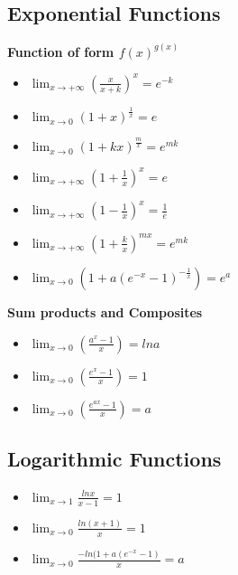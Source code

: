 \documentclass[twocolumn, 10pt]{article}
\begin{document}
\subsection{Exponential Functions}
\textbf{Function of form $f(x)^{g(x)}$}
\begin{itemize}
\item $\lim_{x \to + \infty} (\frac{x}{x+k})^x=e^{-k}$
\item $\lim_{x \to 0} (1+x)^\frac{1}{x}=e$
\item $\lim_{x \to 0} (1+kx)^\frac{m}{x}=e^{mk}$
\item $\lim_{x \to + \infty} (1+ \frac{1}{x})^x=e$
\item $\lim_{x \to + \infty} (1- \frac{1}{x})^x=\frac{1}{e}$
\item $\lim_{x \to + \infty} (1+ \frac{k}{x})^{mx}=e^{mk}$
\item $\lim_{x \to 0} (1+ a(e^{-x}-1)^{- \frac{1}{x}})=e^a$
\end{itemize}
\textbf{Sum products and Composites}
\begin{itemize}
\item $\lim_{x \to 0} (\frac{a^x -1}{x})=lna$
\item $\lim_{x \to 0} (\frac{e^x -1}{x})=1$
\item $\lim_{x \to 0} (\frac{e^{ax}-1}{x})=a$
\end{itemize}
\subsection{Logarithmic Functions}
\begin{itemize}
\item $\lim_{x \to 1} \frac{lnx}{x-1}=1$
\item $\lim_{x \to 0} \frac{ln(x+1)}{x}=1$
\item $\lim_{x \to 0} \frac{-ln(1+a(e^{-x}-1)}{x}=a$
\end{itemize}
\end{document}
